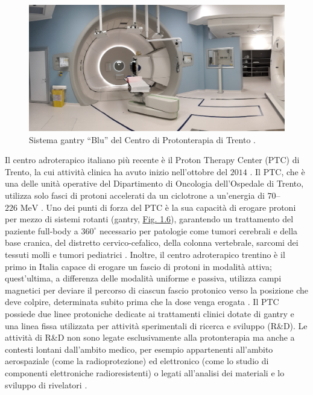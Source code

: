 \documentclass[12pt,a4paper,twoside]{report}
\begin{document}
	\begin{figure}[H]
		\centering
		\includegraphics[width=0.9\linewidth]{gantry.jpg}
		\caption{Sistema gantry ``Blu'' del Centro di Protonterapia di Trento \cite{protonterapia_wiki}.}
		\label{fig:gantry}
	\end{figure}
	Il centro adroterapico italiano più recente è il Proton Therapy Center (PTC) di Trento, la cui attività clinica ha avuto inizio nell'ottobre del $2014$ \cite{trento_pt}. Il PTC, che è una delle unità operative del Dipartimento di Oncologia dell'Ospedale di Trento, utilizza solo fasci di protoni accelerati da un ciclotrone a un'energia di $70$--$226 \mbox{ MeV}$ \cite{FRACCHIOLLA2019215}. Uno dei punti di forza del PTC è la sua capacità di erogare protoni per mezzo di sistemi rotanti (gantry, \hyperref[fig:gantry]{Fig. 1.6}), garantendo un trattamento del paziente full-body a $360^\circ$ necessario per patologie come tumori cerebrali e della base cranica, del distretto cervico-cefalico, della colonna vertebrale, sarcomi dei tessuti molli e tumori pediatrici \cite{trento_servSan}. Inoltre, il centro adroterapico trentino è il primo in Italia capace di erogare un fascio di protoni in modalità attiva; quest'ultima, a differenza delle modalità uniforme e passiva, utilizza campi magnetici per deviare il percorso di ciascun fascio protonico verso la posizione che deve colpire, determinata subito prima che la dose venga erogata \cite{LILT,McGowan2013-pl}. Il PTC possiede due linee protoniche dedicate ai trattamenti clinici dotate di gantry e una linea fissa utilizzata per attività sperimentali di ricerca e sviluppo (R\&D). Le attività di R\&D non sono legate esclusivamente alla protonterapia ma anche a contesti lontani dall'ambito medico, per esempio appartenenti all'ambito aerospaziale (come la radioprotezione) ed elettronico (come lo studio di componenti elettroniche radioresistenti) o legati all'analisi dei materiali e lo sviluppo di rivelatori \cite{trento_pt2}.
	
\end{document}
